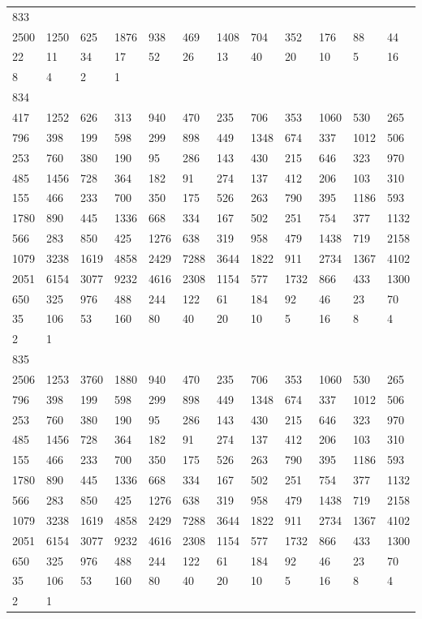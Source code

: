 \begin{longtable}{llllllllllll}
833&&&&&&&&&&&\\
2500& 1250& 625& 1876& 938& 469& 1408& 704& 352& 176& 88& 44\\
22& 11& 34& 17& 52& 26& 13& 40& 20& 10& 5& 16\\
8& 4& 2& 1& \\

834&&&&&&&&&&&\\
417& 1252& 626& 313& 940& 470& 235& 706& 353& 1060& 530& 265\\
796& 398& 199& 598& 299& 898& 449& 1348& 674& 337& 1012& 506\\
253& 760& 380& 190& 95& 286& 143& 430& 215& 646& 323& 970\\
485& 1456& 728& 364& 182& 91& 274& 137& 412& 206& 103& 310\\
155& 466& 233& 700& 350& 175& 526& 263& 790& 395& 1186& 593\\
1780& 890& 445& 1336& 668& 334& 167& 502& 251& 754& 377& 1132\\
566& 283& 850& 425& 1276& 638& 319& 958& 479& 1438& 719& 2158\\
1079& 3238& 1619& 4858& 2429& 7288& 3644& 1822& 911& 2734& 1367& 4102\\
2051& 6154& 3077& 9232& 4616& 2308& 1154& 577& 1732& 866& 433& 1300\\
650& 325& 976& 488& 244& 122& 61& 184& 92& 46& 23& 70\\
35& 106& 53& 160& 80& 40& 20& 10& 5& 16& 8& 4\\
2& 1& \\

835&&&&&&&&&&&\\
2506& 1253& 3760& 1880& 940& 470& 235& 706& 353& 1060& 530& 265\\
796& 398& 199& 598& 299& 898& 449& 1348& 674& 337& 1012& 506\\
253& 760& 380& 190& 95& 286& 143& 430& 215& 646& 323& 970\\
485& 1456& 728& 364& 182& 91& 274& 137& 412& 206& 103& 310\\
155& 466& 233& 700& 350& 175& 526& 263& 790& 395& 1186& 593\\
1780& 890& 445& 1336& 668& 334& 167& 502& 251& 754& 377& 1132\\
566& 283& 850& 425& 1276& 638& 319& 958& 479& 1438& 719& 2158\\
1079& 3238& 1619& 4858& 2429& 7288& 3644& 1822& 911& 2734& 1367& 4102\\
2051& 6154& 3077& 9232& 4616& 2308& 1154& 577& 1732& 866& 433& 1300\\
650& 325& 976& 488& 244& 122& 61& 184& 92& 46& 23& 70\\
35& 106& 53& 160& 80& 40& 20& 10& 5& 16& 8& 4\\
2& 1& \\


\end{longtable}
